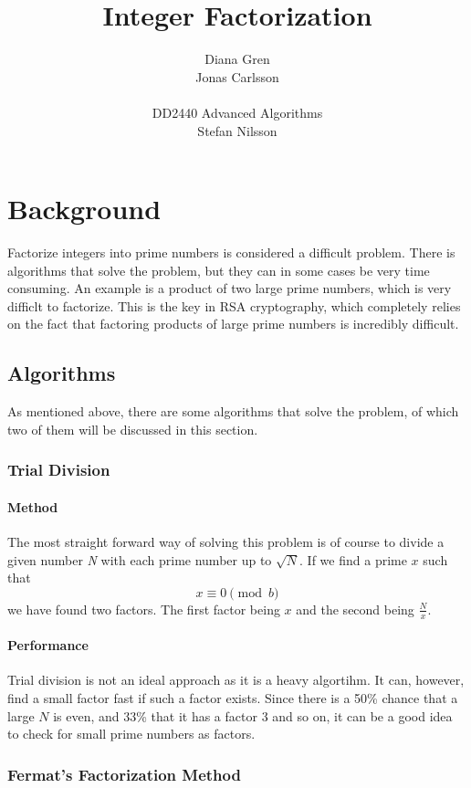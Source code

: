 \documentclass[a4paper, 12pt]{report}
\title{Integer Factorization}
\author{Diana Gren \\ Jonas Carlsson \\\\ DD2440 Advanced Algorithms \\ Stefan Nilsson}
\date{}
\begin{document}
\maketitle
\tableofcontents
\newpage
\chapter{Background}
Factorize integers into prime numbers is considered a difficult problem. There is algorithms that solve the problem, but they can in some cases be very time consuming. An example is a product of two large prime numbers, which is very difficlt to factorize. This is the key in RSA cryptography, which completely relies on the fact that factoring products of large prime numbers is incredibly difficult.

\section{Algorithms}
As mentioned above, there are some algorithms that solve the problem, of which two of them will be discussed in this section.

\subsection{Trial Division}
\subsubsection{Method}
The most straight forward way of solving this problem is of course to divide a given number \emph{N} with each prime number up to $ \sqrt{N} $. If we find a prime $x$ such that
\begin{equation}
x \equiv 0 \pmod b
\end{equation}
we have found two factors. The first factor being $x$ and the second being $ \frac{N}{x} $.

\subsubsection{Performance}
Trial division is not an ideal approach as it is a heavy algortihm. It can, however, find a small factor fast if such a factor exists. Since there is a 50\% chance that a large $N$ is even, and 33\% that it has a factor 3 and so on, it can be a good idea to check for small prime numbers as factors.

\subsection{Fermat's Factorization Method}
\end{document}
